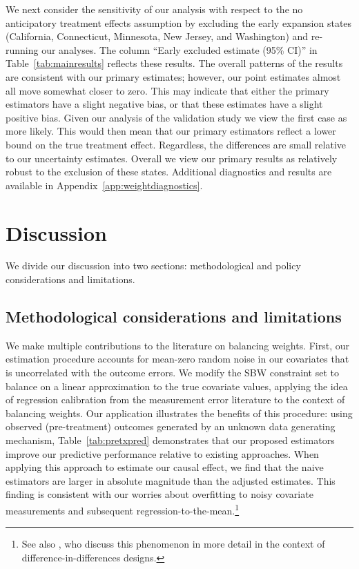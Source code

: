 \documentclass[aoas]{imsart}
\theoremstyle{plain}
\theoremstyle{remark}
\begin{document}
We next consider the sensitivity of our analysis with respect to the no anticipatory treatment effects assumption by excluding the early expansion states (California, Connecticut, Minnesota, New Jersey, and Washington) and re-running our analyses. The column ``Early excluded estimate (95\% CI)'' in Table~\ref{tab:mainresults} reflects these results. The overall patterns of the results are consistent with our primary estimates; however, our point estimates almost all move somewhat closer to zero. This may indicate that either the primary estimators have a slight negative bias, or that these estimates have a slight positive bias. Given our analysis of the validation study we view the first case as more likely. This would then mean that our primary estimators reflect a lower bound on the true treatment effect. Regardless, the differences are small relative to our uncertainty estimates. Overall we view our primary results as relatively robust to the exclusion of these states. Additional diagnostics and results are available in Appendix~\ref{app:weightdiagnostics}.


\section{Discussion}

We divide our discussion into two sections: methodological and policy considerations and limitations. 

\subsection{Methodological considerations and limitations}

We make multiple contributions to the literature on balancing weights. First, our estimation procedure accounts for mean-zero random noise in our covariates that is uncorrelated with the outcome errors. We modify the SBW constraint set to balance on a linear approximation to the true covariate values, applying the idea of regression calibration from the measurement error literature to the context of balancing weights. Our application illustrates the benefits of this procedure: using observed (pre-treatment) outcomes generated by an unknown data generating mechanism, Table~\ref{tab:pretxpred} demonstrates that our proposed estimators improve our predictive performance relative to existing approaches. When applying this approach to estimate our causal effect, we find that the naive estimators are larger in absolute magnitude than the adjusted estimates. This finding is consistent with our worries about overfitting to noisy covariate measurements and subsequent regression-to-the-mean.\footnote{See also \cite{daw2018matching}, who discuss this phenomenon in more detail in the context of difference-in-differences designs.}
\end{document}
